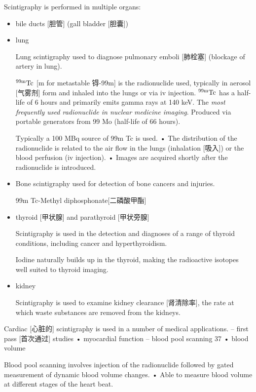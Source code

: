 \documentclass[UTF8,a4paper,11pt]{book}
\theoremstyle{mystyle}{
  \newtheorem{example}{Example}
}
\begin{document}
Scintigraphy is performed in multiple organs:
\begin{itemize}
\item  bile ducts [胆管] (gall bladder [胆囊])
\item lung

Lung scintigraphy used to diagnose pulmonary
emboli [肺栓塞] (blockage of artery in lung).

${\rm ^{99m} Tc}$ [m for metastable 锝-99m] is the radionuclide used, typically in
aerosol [气雾剂] form and inhaled into the lungs or via
iv injection.
${\rm ^{99m} Tc}$ has a half-life of 6 hours and primarily
emits gamma rays at 140 keV. The \emph{most frequently used radionuclide in
nuclear medicine imaging}.
Produced via portable generators from 99 Mo
(half-life of 66 hours).

Typically a 100 MBq source of 99m Tc is used.
• The distribution of the radionuclide is related
to the air flow in the lungs (inhalation [吸入]) or the
blood perfusion (iv injection).
• Images are acquired shortly after the
radionuclide is introduced.

\item

Bone scintigraphy used for detection of bone
cancers and injuries.

99m Tc-Methyl diphosphonate[二磷酸甲酯]

\item thyroid [甲状腺] and parathyroid [甲状旁腺]

Scintigraphy is used in the detection and
diagnoses of a range of thyroid conditions,
including cancer and hyperthyroidism.

Iodine naturally builds up in the thyroid,
making the radioactive isotopes well suited to
thyroid imaging.

\item kidney 

Scintigraphy is used to examine kidney
clearance [肾清除率], the rate at which waste substances
are removed from the kidneys.
\end{itemize}


Cardiac [心脏的] scintigraphy is used in a number of
medical applications.
– first pass [首次通过] studies
• myocardial function
– blood pool scanning 37
• blood volume

Blood pool scanning involves injection of the
radionuclide followed by gated measurement
of dynamic blood volume changes.
• Able to measure blood volume at different
stages of the heart beat.
\end{document}

